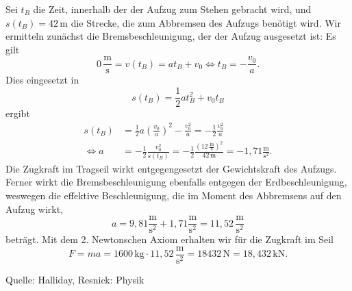 \begin{MExercises}
\begin{MExercise}
               \begin{MSolution}
               Sei $t_B$ die Zeit, innerhalb der der Aufzug zum Stehen gebracht wird, und $s(t_B)=42 \,\text{m}$ die Strecke, die zum Abbremsen des Aufzugs ben\"otigt wird. Wir ermitteln zun\"achst die Bremsbeschleunigung, der der Aufzug ausgesetzt ist: Es gilt
               \begin{equation*}
               0\,\frac{\text{m}}{\text{s}}=v(t_B)=a t_B+v_0\Leftrightarrow t_B=-\frac{v_0}{a}.
               \end{equation*} Dies eingesetzt in 
               \begin{equation*}
               s(t_B)=\frac{1}{2}at_B^2+v_0t_B
               \end{equation*}ergibt
               \begin{eqnarray*}
               s(t_B)&=\frac{1}{2}a\left(\frac{v_0}{a}\right)^2-\frac{v_0^2}{a}=-\frac{1}{2}\frac{v_0^2}{a}\\ 
               \Leftrightarrow a&=-\frac{1}{2}\frac{v_0^2}{s(t_B)}=-\frac{1}{2}\frac{\left(12\,\frac{\text{m}}{\text{s}}\right)^2}{42 \,\text{m}}=-1,71\frac{\text{m}}{\text{s}^2}.
               \end{eqnarray*}
               Die Zugkraft im Tragseil wirkt entgegengesetzt der Gewichtskraft des Aufzugs. Ferner wirkt die Bremsbeschleunigung ebenfalls entgegen der Erdbeschleunigung, weswegen die effektive Beschleunigung, die im Moment des Abbremsens auf den Aufzug wirkt,
               \begin{equation*}
               a={9,81}\frac{\text{m}}{\text{s}^2}+{1,71}\frac{\text{m}}{\text{s}^2}={11,52}\,\frac{\text{m}}{\text{s}^2}
               \end{equation*}betr\"agt. Mit dem 2. Newtonschen Axiom erhalten wir f\"ur die Zugkraft im Seil
               \begin{equation*}
               F=ma=1600\,\text{kg}\cdot {11,52}\,\frac{\text{m}}{\text{s}^2}=18432\,\text{N}={18,432}\,\text{kN.}
               \end{equation*}
               \end{MSolution}
               
               Quelle: Halliday, Resnick: Physik
               \end{MExercise}
               

\end{MExercises}
